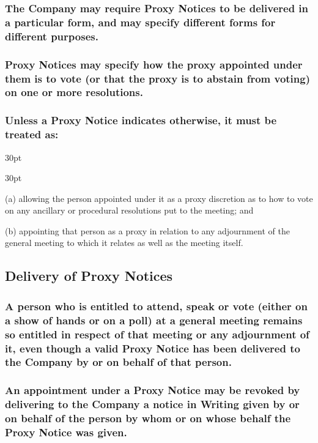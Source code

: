 \documentclass[12pt]{article}
\def\clauseindent{30pt}
\newenvironment{subindentlist}{\raggedright\begin{adjustwidth}{\clauseindent}{}\begin{labeledlist}{\clauseindent}}{\end{labeledlist}\end{adjustwidth}}
\begin{document}
\subsubsection[Form of Proxy Notices]{The Company may require Proxy Notices to be delivered in a particular form, and may specify different forms for different purposes.}
\subsubsection[Directions Contained in Proxy Notices]{Proxy Notices may specify how the proxy appointed under them is to vote (or that the proxy is to abstain from voting) on one or more resolutions.}
\subsubsection[Implication of Proxy Notices]{Unless a Proxy Notice indicates otherwise, it must be treated as:}
\begin{subindentlist}
    \item [(a)] allowing the person appointed under it as a proxy discretion as to how to vote on any ancillary or procedural resolutions put to the meeting; and
    \item [(b)] appointing that person as a proxy in relation to any adjournment of the general meeting to which it relates as well as the meeting itself.
\end{subindentlist}

\subsection{Delivery of Proxy Notices}
\subsubsection[Rights of Members Represented by Proxy]{A person who is entitled to attend, speak or vote (either on a show of hands or on a poll) at a general meeting remains so entitled in respect of that meeting or any adjournment of it, even though a valid Proxy Notice has been delivered to the Company by or on behalf of that person.}
\subsubsection[Revocation of Proxy Notices]{An appointment under a Proxy Notice may be revoked by delivering to the Company a notice in Writing given by or on behalf of the person by whom or on whose behalf the Proxy Notice was given.}
\end{document}
